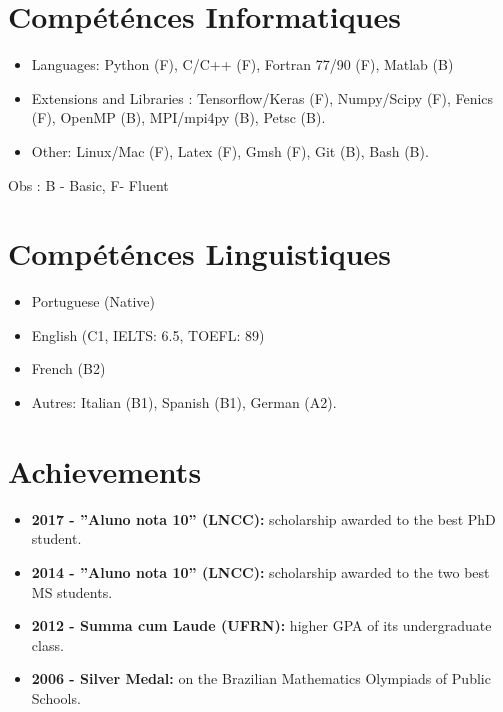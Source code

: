 \documentclass[french]{article}
\begin{document}
\section{Compéténces Informatiques}
\begin{itemize}
	\item Languages: Python (F), C/C++ (F), Fortran 77/90 (F), Matlab (B) 
	\item Extensions and Libraries : Tensorflow/Keras (F), Numpy/Scipy (F), Fenics (F), OpenMP (B), MPI/mpi4py (B), Petsc (B).  
	\item Other: Linux/Mac (F), Latex (F), Gmsh (F), Git (B), Bash (B).
\end{itemize}
Obs : B - Basic, F- Fluent \newline

\section{Compéténces Linguistiques}
\begin{itemize}
	\item Portuguese (Native)
	\item English (C1, IELTS: 6.5, TOEFL: 89)
	\item French (B2)
	\item Autres: Italian (B1), Spanish (B1), German (A2).
\end{itemize}

\section{Achievements}
\begin{itemize}
\item \textbf{2017 - ''Aluno nota 10'' (LNCC):} scholarship awarded to the best PhD student.
\item \textbf{2014 - ''Aluno nota 10'' (LNCC):} scholarship awarded to the two best MS students.
\item \textbf{2012 - Summa cum Laude (UFRN): } higher GPA of its undergraduate class.
\item \textbf{2006 - Silver Medal:} on the Brazilian Mathematics Olympiads of Public Schools.
\end{itemize}
\end{document}
